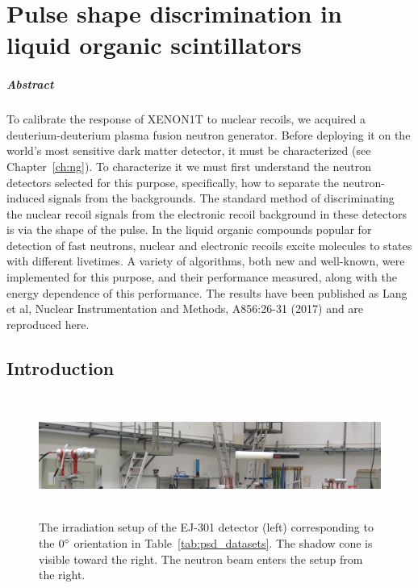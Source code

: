 
\chapter{Pulse shape discrimination in liquid organic scintillators}\label{ch:psd}

\paragraph{Abstract} To calibrate the response of XENON1T to nuclear recoils, we acquired a deuterium-deuterium plasma fusion neutron generator. Before deploying it on the world's most sensitive dark matter detector, it must be characterized (see Chapter~\ref{ch:ng}). To characterize it we must first understand the neutron detectors selected for this purpose, specifically, how to separate the neutron-induced signals from the backgrounds. The standard method of discriminating the nuclear recoil signals from the electronic recoil background in these detectors is via the shape of the pulse. In the liquid organic compounds popular for detection of fast neutrons, nuclear and electronic recoils excite molecules to states with different livetimes. A variety of algorithms, both new and well-known, were implemented for this purpose, and their performance measured, along with the energy dependence of this performance. The results have been published as Lang et al, Nuclear Instrumentation and Methods, A856:26-31 (2017) and are reproduced here.

\section{Introduction}

\begin{figure}[htbp]
\centering
    \includegraphics[width=\textwidth,height=4cm]{figures/psd/fig_ptb_setup}
    \caption{The irradiation setup of the EJ-301 detector (left) corresponding to the $0{}^{\circ}$ orientation in Table~\ref{tab:psd_datasets}. The shadow cone is visible toward the right. The neutron beam enters the setup from the right.}\label{fig:psd_detector_setup}
\end{figure}

